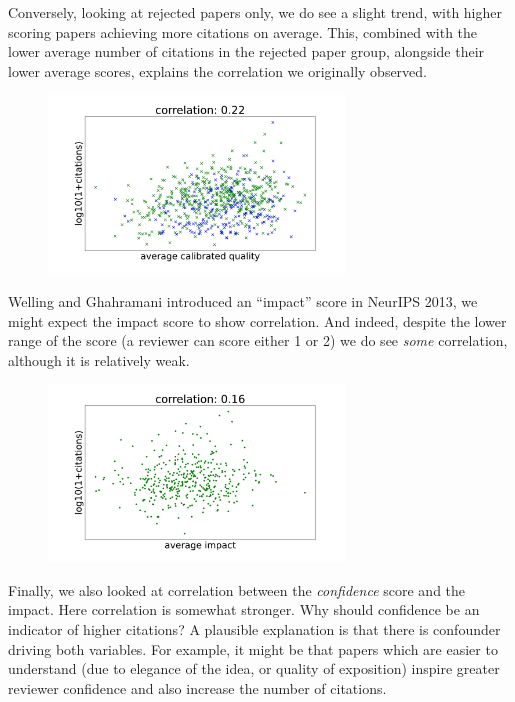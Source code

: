 Conversely, looking at rejected papers only, we do see a slight trend,
with higher scoring papers achieving more citations on average. This,
combined with the lower average number of citations in the rejected
paper group, alongside their lower average scores, explains the
correlation we originally observed.

\begin{figure}[htb]
\includegraphics[width=0.70\textwidth]{diagrams/neurips/citations-vs-average-calibrated-quality-reject.pdf}


\caption{}
\label{citations-vs-average-calibrated-quality-reject}
\end{figure}

Welling and Ghahramani introduced an ``impact'' score in NeurIPS 2013,
we might expect the impact score to show correlation. And indeed,
despite the lower range of the score (a reviewer can score either 1 or
2) we do see \emph{some} correlation, although it is relatively weak.

\begin{figure}[htb]
\includegraphics[width=0.70\textwidth]{diagrams/neurips/citations-vs-average-impact-accept.pdf}


\caption{}
\label{citations-vs-average-impact-accept}
\end{figure}

Finally, we also looked at correlation between the \emph{confidence}
score and the impact. Here correlation is somewhat stronger. Why should
confidence be an indicator of higher citations? A plausible explanation
is that there is confounder driving both variables. For example, it
might be that papers which are easier to understand (due to elegance of
the idea, or quality of exposition) inspire greater reviewer confidence
and also increase the number of citations.

